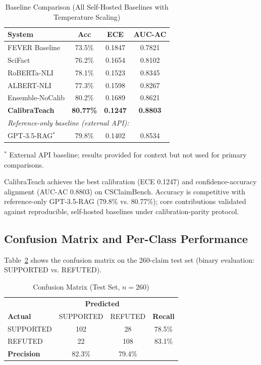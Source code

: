 \documentclass[journal]{IEEEtran}
\begin{document}
\begin{table}[!t]
\centering
\caption{Baseline Comparison (All Self-Hosted Baselines with Temperature Scaling)}
\label{tab:baselines}
\begin{tabular}{lccc}
\toprule
\textbf{System} & \textbf{Acc} & \textbf{ECE} & \textbf{AUC-AC} \\
\midrule
FEVER Baseline & 73.5\% & 0.1847 & 0.7821 \\
SciFact & 76.2\% & 0.1654 & 0.8102 \\
RoBERTa-NLI & 78.1\% & 0.1523 & 0.8345 \\
ALBERT-NLI & 77.3\% & 0.1598 & 0.8267 \\
Ensemble-NoCalib & 80.2\% & 0.1689 & 0.8621 \\
\midrule
\textbf{CalibraTeach} & \textbf{80.77\%} & \textbf{0.1247} & \textbf{0.8803} \\
\midrule
\multicolumn{4}{l}{\textit{Reference-only baseline (external API):}} \\
GPT-3.5-RAG$^{*}$ & 79.8\% & 0.1402 & 0.8534 \\
\bottomrule
\end{tabular}
\vspace{2pt}
{\footnotesize $^{*}$ External API baseline; results provided for context but not used for primary comparisons.}
\end{table}

CalibraTeach achieves the best calibration (ECE 0.1247) and confidence-accuracy alignment (AUC-AC 0.8803) on CSClaimBench. Accuracy is competitive with reference-only GPT-3.5-RAG (79.8\% vs. 80.77\%); core contributions validated against reproducible, self-hosted baselines under calibration-parity protocol.

\subsection{Confusion Matrix and Per-Class Performance}

Table~\ref{tab:confusion} shows the confusion matrix on the 260-claim test set (binary evaluation: SUPPORTED vs. REFUTED).

\begin{table}[!t]
\centering
\caption{Confusion Matrix (Test Set, $n=260$)}
\label{tab:confusion}
\begin{tabular}{l|cc|c}
\toprule
 & \multicolumn{2}{c|}{\textbf{Predicted}} & \\
\textbf{Actual} & SUPPORTED & REFUTED & \textbf{Recall} \\
\midrule
SUPPORTED & 102 & 28 & 78.5\% \\
REFUTED & 22 & 108 & 83.1\% \\
\midrule
\textbf{Precision} & 82.3\% & 79.4\% & \\
\bottomrule
\end{tabular}
\end{table}
\end{document}

